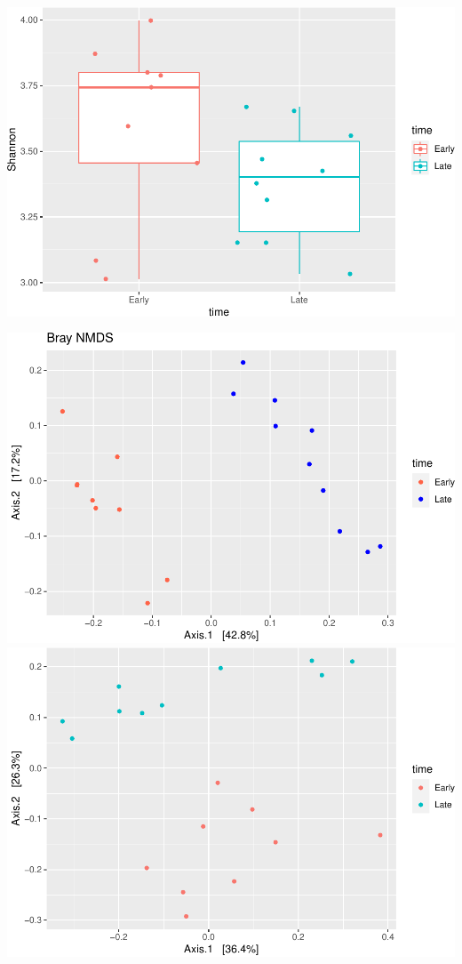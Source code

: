 \documentclass[
]{book}
\begin{document}
\includegraphics{16sworkshop_files/figure-latex/alpha diversit-1.pdf}

\includegraphics{16sworkshop_files/figure-latex/unnamed-chunk-3-1.pdf} \includegraphics{16sworkshop_files/figure-latex/unnamed-chunk-3-2.pdf}
\end{document}
